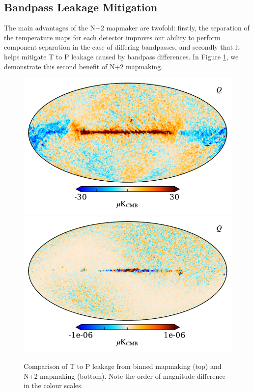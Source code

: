 \documentclass{aa}
\begin{document}
\subsection{Bandpass Leakage Mitigation}

The main advantages of the N+2 mapmaker are twofold: firstly, the separation of the temperature maps for each detector improves our ability to perform component separation in the case of differing bandpasses, and secondly that it helps mitigate T to P leakage caused by bandpass differences. In Figure \ref{fig:leak}, we demonstrate this second benefit of N+2 mapmaking. 

\begin{figure}[]
\includegraphics[width=\linewidth]{figs/map_Q_leak_comp.pdf}\\
\includegraphics[width=\linewidth]{figs/map_Q_leak_nplus2_comp.pdf}
\caption{Comparison of T to P leakage from binned mapmaking (top) and N+2 mapmaking (bottom). Note the order of magnitude difference in the colour scales.}
\label{fig:leak}
\end{figure}
\end{document}
